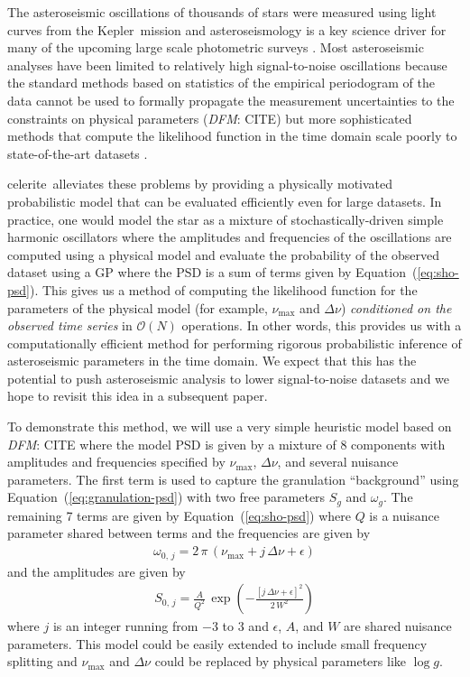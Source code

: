 \documentclass[manuscript, letterpaper]{aastex6}
\newcommand{\project}[1]{\textsf{#1}}
\newcommand{\kepler}{\project{Kepler}}
\newcommand{\celerite}{\project{celerite}}
\renewcommand{\eqref}[1]{\ref{eq:#1}}
\newcommand{\Eq}[1]{Equation~(\eqref{#1})}
\newcommand{\eq}[1]{\Eq{#1}}
\newcommand{\todo}[3]{{\color{#2}\emph{#1}: #3}}
\newcommand{\dfmtodo}[1]{\todo{DFM}{red}{#1}}
\begin{document}
The asteroseismic oscillations of thousands of stars were measured using light
curves from the \kepler\ mission \citep{Gilliland:2010, Chaplin:2011,
Chaplin:2013, Stello:2013} and asteroseismology is a key science driver for
many of the upcoming large scale photometric surveys \citep{Campante:2016,
Rauer:2014, Gould:2015}.
Most asteroseismic analyses have been limited to relatively high
signal-to-noise oscillations because the standard methods based on statistics
of the empirical periodogram of the data cannot be used to formally propagate
the measurement uncertainties to the constraints on physical parameters
(\dfmtodo{CITE}) but more sophisticated methods that compute the likelihood
function in the time domain scale poorly to state-of-the-art datasets
\citep{Brewer:2009}.

\celerite\ alleviates these problems by providing a physically motivated
probabilistic model that can be evaluated efficiently even for large datasets.
In practice, one would model the star as a mixture of stochastically-driven
simple harmonic oscillators where the amplitudes and frequencies of the
oscillations are computed using a physical model and evaluate the probability
of the observed dataset using a GP where the PSD is a sum of terms given by
\eq{sho-psd}.
This gives us a method of computing the likelihood function for the parameters
of the physical model (for example, $\nu_\mathrm{max}$ and $\Delta \nu$)
\emph{conditioned on the observed time series} in $\mathcal{O}(N)$ operations.
In other words, this provides us with a computationally efficient method for
performing rigorous probabilistic inference of asteroseismic parameters in the
time domain.
We expect that this has the potential to push asteroseismic analysis to lower
signal-to-noise datasets and we hope to revisit this idea in a subsequent
paper.

To demonstrate this method, we will use a very simple heuristic model based on
\dfmtodo{CITE} where the model PSD is given by a mixture of 8 components with
amplitudes and frequencies specified by $\nu_\mathrm{max}$, $\Delta \nu$, and
several nuisance parameters.
The first term is used to capture the granulation ``background''
\citep{Kallinger:2014} using \eq{granulation-psd} with two free parameters
$S_g$ and $\omega_g$.
The remaining  7 terms are given by \eq{sho-psd} where $Q$ is a nuisance
parameter shared between terms and the frequencies are given by
\begin{eqnarray}
\omega_{0,\,j} = 2\,\pi\,(\nu_\mathrm{max} + j\,\Delta\nu + \epsilon)
\end{eqnarray}
and the amplitudes are given by
\begin{eqnarray}
S_{0,\,j} =
    \frac{A}{Q^2}\,\exp\left(-\frac{[j\,\Delta\nu + \epsilon]^2}{2\,W^2}\right)
\end{eqnarray}
where $j$ is an integer running from $-3$ to 3 and $\epsilon$, $A$, and $W$
are shared nuisance parameters.
This model could be easily extended to include small frequency splitting and
$\nu_\mathrm{max}$ and $\Delta \nu$ could be replaced by physical parameters
like $\log g$.
\end{document}
